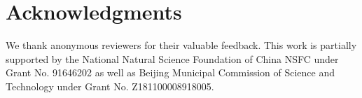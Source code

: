 \section*{Acknowledgments}

We thank anonymous reviewers for their valuable feedback.
This work is partially supported by the National Natural Science Foundation of China NSFC under Grant No. 91646202 as well as Beijing Municipal Commission of Science and Technology under Grant No. Z181100008918005.